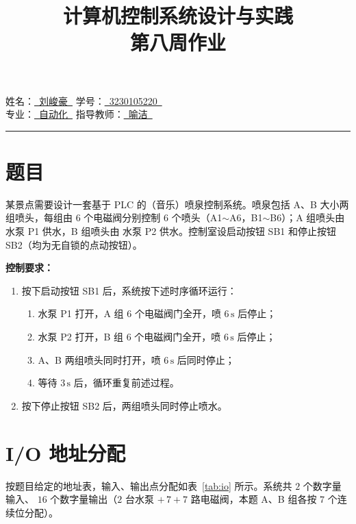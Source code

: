 \documentclass[12pt,a4paper]{ctexart}
\title{\textbf{计算机控制系统设计与实践\\ 第八周作业}}
\author{}
\date{}
\begin{document}
\maketitle

\noindent
姓\quad 名：\underline{\ 刘峻豪\ }\hspace{4em} 学\quad 号：\underline{\ 3230105220\ }\\[1.2ex]
专\quad 业：\underline{\ 自动化\ }\hspace{4em} 指导教师：\underline{\ 喻洁\ }

\bigskip
\hrule
\bigskip

\section{题目}
某景点需要设计一套基于 PLC 的（音乐）喷泉控制系统。喷泉包括 A、B 大小两组喷头，每组由
$6$ 个电磁阀分别控制 $6$ 个喷头（A1$\sim$A6，B1$\sim$B6）；A 组喷头由水泵 P1 供水，B 组喷头由
水泵 P2 供水。控制室设启动按钮 SB1 和停止按钮 SB2（均为无自锁的点动按钮）。

\medskip
\noindent\textbf{控制要求：}
\begin{enumerate}
  \item 按下启动按钮 SB1 后，系统按下述时序循环运行：
  \begin{enumerate}
    \item 水泵 P1 打开，A 组 $6$ 个电磁阀门全开，喷 $6\,\mathrm{s}$ 后停止；
    \item 水泵 P2 打开，B 组 $6$ 个电磁阀门全开，喷 $6\,\mathrm{s}$ 后停止；
    \item A、B 两组喷头同时打开，喷 $6\,\mathrm{s}$ 后同时停止；
    \item 等待 $3\,\mathrm{s}$ 后，循环重复前述过程。
  \end{enumerate}
  \item 按下停止按钮 SB2 后，两组喷头同时停止喷水。
\end{enumerate}

\section{I/O 地址分配}
按题目给定的地址表，输入、输出点分配如表~\ref{tab:io} 所示。系统共 $2$ 个数字量输入、
$16$ 个数字量输出（$2$ 台水泵 $+\,7+7$ 路电磁阀，本题 A、B 组各按 $7$ 个连续位分配）。
\end{document}
